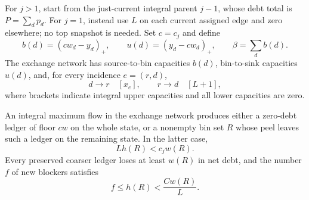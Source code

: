 For \(j>1\), start from the just-current integral parent \(j-1\),
whose debt total is \(P=\sum_dp_d\).  For \(j=1\), instead use
\(L\) on each current assigned edge and zero elsewhere; no top
snapshot is needed.  Set \(c=c_j\) and define
\begin{equation}
 b(d)=(cw_d-y_d)_+,\qquad u(d)=(y_d-cw_d)_+,\qquad
 \beta=\sum_db(d).
 \label{match:exchange-demands}
\end{equation}
The exchange network has source-to-bin capacities \(b(d)\),
bin-to-sink capacities \(u(d)\), and, for every incidence \(e=(r,d)\),
\[
                d\longrightarrow r\quad[x_e],
       \qquad   r\longrightarrow d\quad[L+1],
\]
where brackets indicate integral upper capacities and all lower
capacities are zero.

\begin{lemma}
\label{match:exchange-projection}
An integral maximum flow in the exchange network produces either
a zero-debt ledger of floor \(cw\) on the whole state, or a nonempty
bin set \(R\) whose peel leaves such a ledger on the remaining state.
In the latter case,
\begin{equation}
                              Lh(R)<c_jw(R).
 \label{match:failed-floor}
\end{equation}
Every preserved coarser ledger loses at least \(w(R)\) in net debt,
and the number \(f\) of new blockers satisfies
\begin{equation}
                         f\le h(R)<\frac{Cw(R)}{L}.
 \label{match:peel-blockers}
\end{equation}
\end{lemma}
